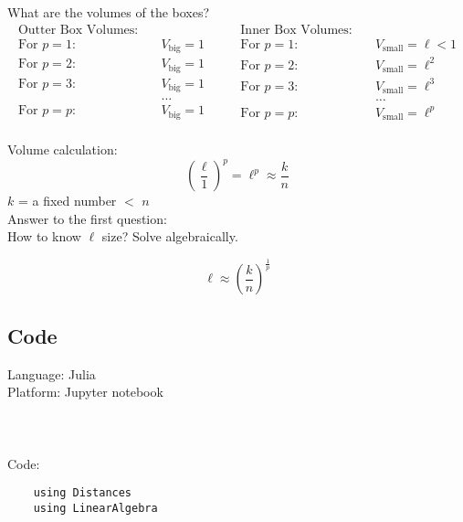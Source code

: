 What are the volumes of the boxes?
\[
    \begin{aligned}
        \text{Outter Box Volumes:} \quad\\
        \text{For } p=1: \quad & V_{\text{big}} = 1 \\
        \text{For } p=2: \quad & V_{\text{big}} = 1 \\
        \text{For } p=3: \quad & V_{\text{big}} = 1 \\
        & \dots \\
        \text{For } p=p: \quad & V_{\text{big}} = 1 \\
        \end{aligned}
        \quad \quad
        \begin{aligned}
        \text{Inner Box Volumes:} \quad\\
        \text{For } p=1: \quad & V_{\text{small}} = \ell < 1 \\
        \text{For } p=2: \quad & V_{\text{small}} = \ell^2 \\
        \text{For } p=3: \quad & V_{\text{small}} = \ell^3 \\
        & \dots \\
        \text{For } p=p: \quad & V_{\text{small}} = \ell^p \\
    \end{aligned}
\]

Volume calculation:
\[
    \left(\frac{\ell}{1}\right)^p = \ell^p \approx \frac{k}{n}
\]
$k$ = a fixed number $<$ $n$ \\

Answer to the first question: \\
How to know $\ell$ size? Solve algebraically.

\[
    \ell \approx \left(\frac{k}{n}\right)^\frac{1}{p}
\]

\subsection{Code}
Language: Julia\\
Platform: Jupyter notebook\\\\\\\\
Code:\\

\begin{tcolorbox}[width=\textwidth, left=-6mm, sharp corners, boxrule=0pt]
  \begin{verbatim}
    using Distances
    using LinearAlgebra 
  \end{verbatim}
\end{tcolorbox}

